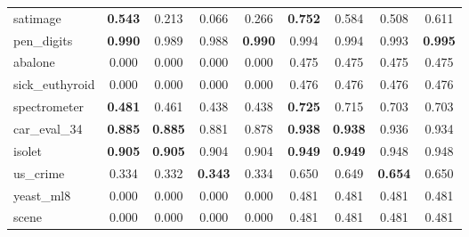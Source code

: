 \begin{figure}[ht]
\begin{tabular}{p{22mm}|*4{p{14mm}}|*4{p{14mm}}}
        satimage&\multicolumn{1}{c}{\textbf{0.543}}&\multicolumn{1}{c}{0.213}&\multicolumn{1}{c}{0.066}&\multicolumn{1}{c|}{0.266}&\multicolumn{1}{c}{\textbf{0.752}}&\multicolumn{1}{c}{0.584}&\multicolumn{1}{c}{0.508}&\multicolumn{1}{c}{0.611}\\
        pen\_digits&\multicolumn{1}{c}{\textbf{0.990}}&\multicolumn{1}{c}{0.989}&\multicolumn{1}{c}{0.988}&\multicolumn{1}{c|}{\textbf{0.990}}&\multicolumn{1}{c}{0.994}&\multicolumn{1}{c}{0.994}&\multicolumn{1}{c}{0.993}&\multicolumn{1}{c}{\textbf{0.995}}\\
        abalone&\multicolumn{1}{c}{0.000}&\multicolumn{1}{c}{0.000}&\multicolumn{1}{c}{0.000}&\multicolumn{1}{c|}{0.000}&\multicolumn{1}{c}{0.475}&\multicolumn{1}{c}{0.475}&\multicolumn{1}{c}{0.475}&\multicolumn{1}{c}{0.475}\\
        sick\_euthyroid&\multicolumn{1}{c}{0.000}&\multicolumn{1}{c}{0.000}&\multicolumn{1}{c}{0.000}&\multicolumn{1}{c|}{0.000}&\multicolumn{1}{c}{0.476}&\multicolumn{1}{c}{0.476}&\multicolumn{1}{c}{0.476}&\multicolumn{1}{c}{0.476}\\
        spectrometer&\multicolumn{1}{c}{\textbf{0.481}}&\multicolumn{1}{c}{0.461}&\multicolumn{1}{c}{0.438}&\multicolumn{1}{c|}{0.438}&\multicolumn{1}{c}{\textbf{0.725}}&\multicolumn{1}{c}{0.715}&\multicolumn{1}{c}{0.703}&\multicolumn{1}{c}{0.703}\\
        car\_eval\_34&\multicolumn{1}{c}{\textbf{0.885}}&\multicolumn{1}{c}{\textbf{0.885}}&\multicolumn{1}{c}{0.881}&\multicolumn{1}{c|}{0.878}&\multicolumn{1}{c}{\textbf{0.938}}&\multicolumn{1}{c}{\textbf{0.938}}&\multicolumn{1}{c}{0.936}&\multicolumn{1}{c}{0.934}\\
        isolet&\multicolumn{1}{c}{\textbf{0.905}}&\multicolumn{1}{c}{\textbf{0.905}}&\multicolumn{1}{c}{0.904}&\multicolumn{1}{c|}{0.904}&\multicolumn{1}{c}{\textbf{0.949}}&\multicolumn{1}{c}{\textbf{0.949}}&\multicolumn{1}{c}{0.948}&\multicolumn{1}{c}{0.948}\\
        us\_crime&\multicolumn{1}{c}{0.334}&\multicolumn{1}{c}{0.332}&\multicolumn{1}{c}{\textbf{0.343}}&\multicolumn{1}{c|}{0.334}&\multicolumn{1}{c}{0.650}&\multicolumn{1}{c}{0.649}&\multicolumn{1}{c}{\textbf{0.654}}&\multicolumn{1}{c}{0.650}\\
        yeast\_ml8&\multicolumn{1}{c}{0.000}&\multicolumn{1}{c}{0.000}&\multicolumn{1}{c}{0.000}&\multicolumn{1}{c|}{0.000}&\multicolumn{1}{c}{0.481}&\multicolumn{1}{c}{0.481}&\multicolumn{1}{c}{0.481}&\multicolumn{1}{c}{0.481}\\
        scene&\multicolumn{1}{c}{0.000}&\multicolumn{1}{c}{0.000}&\multicolumn{1}{c}{0.000}&\multicolumn{1}{c|}{0.000}&\multicolumn{1}{c}{0.481}&\multicolumn{1}{c}{0.481}&\multicolumn{1}{c}{0.481}&\multicolumn{1}{c}{0.481}\\

\end{tabular}
\end{figure}
